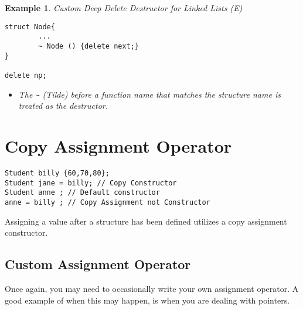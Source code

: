 \documentclass{article}
\newtheorem{ex}[theorem]{Example}
\begin{document}
\begin{ex} Custom Deep Delete Destructor for Linked Lists \textit{(E)}
\begin{lstlisting}
struct Node{
		...
		~ Node () {delete next;} 		
}

delete np;
\end{lstlisting}
\begin{itemize}
\item The \verb|~| (Tilde) before a function name that matches the structure name is treated as the destructor. 
\end{itemize}
\end{ex}


\section{Copy Assignment Operator}
\begin{lstlisting}
Student billy {60,70,80};
Student jane = billy; // Copy Constructor 
Student anne ; // Default constructor 
anne = billy ; // Copy Assignment not Constructor 
\end{lstlisting}

Assigning a value after a structure has been defined utilizes a copy assignment constructor. 

\subsection{Custom Assignment Operator}
Once again, you may need to occasionally write your own assignment operator. A good example of when this may happen, is when you are dealing with pointers.
\end{document}
